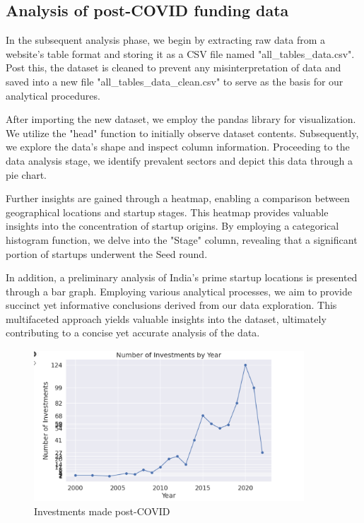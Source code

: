 \documentclass[12pt]{article}
\begin{document}
\subsection{Analysis of post-COVID funding data}

In the subsequent analysis phase, we begin by extracting raw data from a website's table format and storing it as a CSV file named "all\_tables\_data.csv". Post this, the dataset is cleaned to prevent any misinterpretation of data and saved into a new file "all\_tables\_data\_clean.csv" to serve as the basis for our analytical procedures.

After importing the new dataset, we employ the pandas library for visualization. We utilize the "head" function to initially observe dataset contents. Subsequently, we explore the data's shape and inspect column information. Proceeding to the data analysis stage, we identify prevalent sectors and depict this data through a pie chart.

Further insights are gained through a heatmap, enabling a comparison between geographical locations and startup stages. This heatmap provides valuable insights into the concentration of startup origins. By employing a categorical histogram function, we delve into the "Stage" column, revealing that a significant portion of startups underwent the Seed round.

In addition, a preliminary analysis of India's prime startup locations is presented through a bar graph. Employing various analytical processes, we aim to provide succinct yet informative conclusions derived from our data exploration. This multifaceted approach yields valuable insights into the dataset, ultimately contributing to a concise yet accurate analysis of the data.

\begin{figure}[ht]
    \centering
    \includegraphics[width = 0.9\textwidth]{Figures/Post_covid_yearly_investments.png}
    \caption{Investments made post-COVID}
    \label{fig:Investments made post-COVID}
\end{figure}
\end{document}
